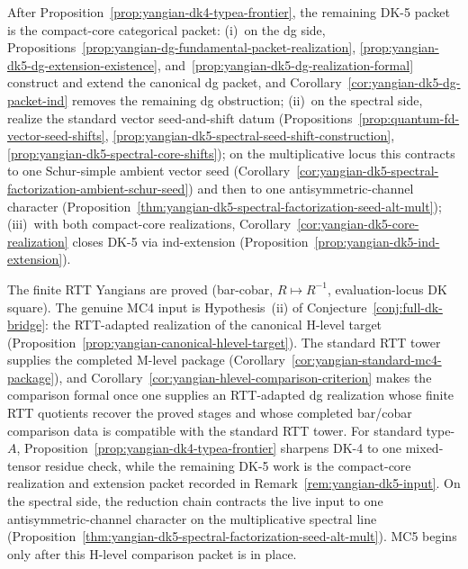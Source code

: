 \begin{remark}
\label{rem:yangian-dk5-input}
After Proposition~\ref{prop:yangian-dk4-typea-frontier}, the remaining
DK-5 packet is the compact-core categorical packet:
\textup{(i)}~on the dg side,
Propositions~\ref{prop:yangian-dg-fundamental-packet-realization},
\ref{prop:yangian-dk5-dg-extension-existence},
and~\ref{prop:yangian-dk5-dg-realization-formal} construct and extend
the canonical dg packet, and
Corollary~\ref{cor:yangian-dk5-dg-packet-ind} removes the remaining
dg obstruction;
\textup{(ii)}~on the spectral side, realize the standard vector
seed-and-shift datum
(Propositions~\ref{prop:quantum-fd-vector-seed-shifts},
\ref{prop:yangian-dk5-spectral-seed-shift-construction},
\ref{prop:yangian-dk5-spectral-core-shifts}); on the multiplicative
locus this contracts to one Schur-simple ambient vector seed
(Corollary~\ref{cor:yangian-dk5-spectral-factorization-ambient-schur-seed})
and then to one antisymmetric-channel character
(Proposition~\ref{thm:yangian-dk5-spectral-factorization-seed-alt-mult});
\textup{(iii)}~with both compact-core realizations,
Corollary~\ref{cor:yangian-dk5-core-realization} closes DK-5 via
ind-extension (Proposition~\ref{prop:yangian-dk5-ind-extension}).
\end{remark}

\begin{remark}
\label{rem:yangian-mc4-boundary}
The finite RTT Yangians are proved (bar-cobar, $R\mapsto R^{-1}$,
evaluation-locus DK square). The genuine MC4 input is
Hypothesis~\textup{(ii)} of Conjecture~\ref{conj:full-dk-bridge}: the
RTT-adapted realization of the canonical H-level target
(Proposition~\ref{prop:yangian-canonical-hlevel-target}).
The standard RTT tower supplies the completed M-level package
(Corollary~\ref{cor:yangian-standard-mc4-package}), and
Corollary~\ref{cor:yangian-hlevel-comparison-criterion} makes the
comparison formal once one supplies an RTT-adapted dg realization whose
finite RTT quotients recover the proved stages and whose completed
bar/cobar comparison data is compatible with the standard RTT tower.
For standard type-$A$,
Proposition~\ref{prop:yangian-dk4-typea-frontier} sharpens DK-4 to
one mixed-tensor residue check, while the remaining DK-5 work is the
compact-core realization and extension packet recorded in
Remark~\ref{rem:yangian-dk5-input}. On the spectral side, the
reduction chain contracts the live input to one antisymmetric-channel
character on the multiplicative spectral line
(Proposition~\ref{thm:yangian-dk5-spectral-factorization-seed-alt-mult}).
MC5 begins only after this H-level comparison packet is in place.
\end{remark}

